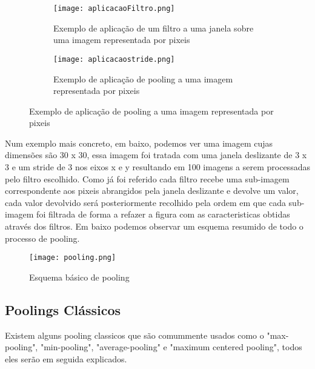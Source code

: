 \begin{figure}[H]

  
  \captionsetup{justification=centering}
  \captionsetup{justification=centering}
  \begin{subfigure}{.5\textwidth}
  \centering
  \texttt{[image: aplicacaoFiltro.png]}
  \caption {Exemplo de aplicação de um filtro a uma janela sobre uma imagem representada por pixeis}
  \end{subfigure}
  \begin{subfigure}{.5\textwidth}
  \centering
   \texttt{[image: aplicacaostride.png]}
   \caption {Exemplo de aplicação de pooling a uma imagem representada por pixeis}
   \end{subfigure}

\end{figure}

Num exemplo mais concreto, em baixo, podemos ver uma imagem cujas dimensões são 30 x 30, essa imagem foi tratada com uma janela deslizante de 3 x 3 e um stride de 3 nos eixos x e y resultando em 100 imagens a serem processadas pelo filtro escolhido.\newline
Como já foi referido cada filtro recebe uma sub-imagem correspondente aos pixeis abrangidos pela janela deslizante e devolve um valor, cada valor devolvido será posteriormente recolhido pela ordem em que cada sub-imagem foi filtrada de forma a refazer a figura com as caracteristicas obtidas através dos filtros. Em baixo podemos observar um esquema resumido de todo o processo de pooling.  

\begin{figure}[H]

  \centering
  \captionsetup{justification=centering}

  \texttt{[image: pooling.png]}
  
  \caption {Esquema básico de pooling}

\end{figure}

\subsection{Poolings Clássicos}\hfill\newline
\hfill\newline
\label{subsec:poolingClassico}

Existem alguns pooling classicos que são comummente usados como o "max-pooling", "min-pooling", "average-pooling" e "maximum centered pooling", todos eles serão em seguida explicados.

